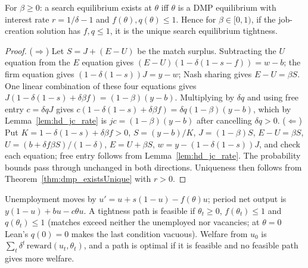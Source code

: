\begin{theorem}[Equilibrium is job creation at $r = 1/\delta - 1$]
\label{thm:hd_isSearchEqm_iff}
\leanok
{}
For $\beta \ge 0$: a search equilibrium exists at $\theta$ iff $\theta$ is a DMP equilibrium with interest rate
$r = 1/\delta - 1$ and $f(\theta), q(\theta) \le 1$. Hence for $\beta \in [0,1)$, if the job-creation solution has
$f, q \le 1$, it is the unique search equilibrium tightness.
\end{theorem}
\begin{proof}
\leanok
($\Rightarrow$) Let $S = J + (E - U)$ be the match surplus. Subtracting the $U$ equation from the $E$ equation
gives $(E-U)(1 - \delta(1 - s - f)) = w - b$; the firm equation gives $(1 - \delta(1-s))J = y - w$; Nash sharing
gives $E - U = \beta S$. One linear combination of these four equations gives
$J(1 - \delta(1-s) + \delta\beta f) = (1-\beta)(y-b)$. Multiplying by $\delta q$ and using free entry
$c = \delta q J$ gives $c(1 - \delta(1-s) + \delta\beta f) = \delta q (1-\beta)(y-b)$, which by
Lemma~\ref{lem:hd_jc_rate} is $jc = (1-\beta)(y-b)$ after cancelling $\delta q > 0$.
($\Leftarrow$) Put $K = 1 - \delta(1-s) + \delta\beta f > 0$, $S = (y-b)/K$, $J = (1-\beta)S$, $E - U = \beta S$,
$U = (b + \delta f\beta S)/(1-\delta)$, $E = U + \beta S$, $w = y - (1 - \delta(1-s))J$, and check each equation;
free entry follows from Lemma~\ref{lem:hd_jc_rate}. The probability bounds pass through unchanged in both
directions. Uniqueness then follows from Theorem~\ref{thm:dmp_existsUnique} with $r > 0$.
\end{proof}

\begin{definition}
\label{def:hd_planner}
\leanok
{}
Unemployment moves by $u' = u + s(1-u) - f(\theta)u$; period net output is $y(1-u) + bu - c\theta u$. A tightness
path is feasible if $\theta_t \ge 0$, $f(\theta_t) \le 1$ and $q(\theta_t) \le 1$ (matches exceed neither the
unemployed nor vacancies; at $\theta = 0$ Lean's $q(0) = 0$ makes the last condition vacuous). Welfare from $u_0$ is
$\sum_t \delta^t\,\mathrm{reward}(u_t, \theta_t)$, and a path is optimal if it is feasible and no feasible path
gives more welfare.
\end{definition}

